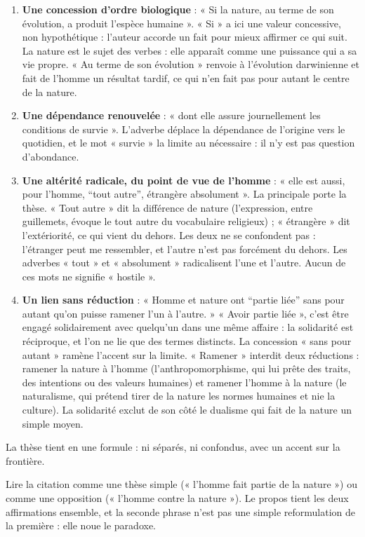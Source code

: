 \documentclass[11pt,a4paper]{article}
\providecommand{\tightlist}{\setlength{\itemsep}{0pt}\setlength{\parskip}{0pt}}
\begin{document}
\begin{enumerate}
\def\labelenumi{\arabic{enumi}.}
\tightlist
\item
  \textbf{Une concession d'ordre biologique} : « Si la nature, au terme de son évolution, a produit l'espèce humaine ». « Si » a ici une valeur concessive, non hypothétique : l'auteur accorde un fait pour mieux affirmer ce qui suit. La nature est le sujet des verbes : elle apparaît comme une puissance qui a sa vie propre. « Au terme de son évolution » renvoie à l'évolution darwinienne et fait de l'homme un résultat tardif, ce qui n'en fait pas pour autant le centre de la nature.
\item
  \textbf{Une dépendance renouvelée} : « dont elle assure journellement les conditions de survie ». L'adverbe déplace la dépendance de l'origine vers le quotidien, et le mot « survie » la limite au nécessaire : il n'y est pas question d'abondance.
\item
  \textbf{Une altérité radicale, du point de vue de l'homme} : « elle est aussi, pour l'homme, ``tout autre'', étrangère absolument ». La principale porte la thèse. « Tout autre » dit la différence de nature (l'expression, entre guillemets, évoque le tout autre du vocabulaire religieux) ; « étrangère » dit l'extériorité, ce qui vient du dehors. Les deux ne se confondent pas : l'étranger peut me ressembler, et l'autre n'est pas forcément du dehors. Les adverbes « tout » et « absolument » radicalisent l'une et l'autre. Aucun de ces mots ne signifie « hostile ».
\item
  \textbf{Un lien sans réduction} : « Homme et nature ont ``partie liée'' sans pour autant qu'on puisse ramener l'un à l'autre. » « Avoir partie liée », c'est être engagé solidairement avec quelqu'un dans une même affaire : la solidarité est réciproque, et l'on ne lie que des termes distincts. La concession « sans pour autant » ramène l'accent sur la limite. « Ramener » interdit deux réductions : ramener la nature à l'homme (l'anthropomorphisme, qui lui prête des traits, des intentions ou des valeurs humaines) et ramener l'homme à la nature (le naturalisme, qui prétend tirer de la nature les normes humaines et nie la culture). La solidarité exclut de son côté le dualisme qui fait de la nature un simple moyen.
\end{enumerate}

La thèse tient en une formule : ni séparés, ni confondus, avec un accent sur la frontière.

\begin{piege}

Lire la citation comme une thèse simple (« l'homme fait partie de la nature ») ou comme une opposition (« l'homme contre la nature »). Le propos tient les deux affirmations ensemble, et la seconde phrase n'est pas une simple reformulation de la première : elle noue le paradoxe.

\end{piege}
\end{document}

